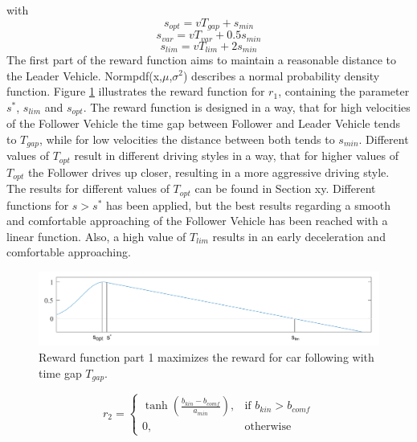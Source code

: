 \documentclass[review]{elsarticle}
\begin{document}
with
\begin{equation}
s_{opt} = vT_{gap} + s_{min}
\end{equation}
\begin{equation}
s_{var} = vT_{var} + 0.5s_{min}
\end{equation}
\begin{equation}
s_{lim} = vT_{lim} + 2s_{min}
\end{equation}
The first part of the reward function aims to maintain a reasonable distance to the Leader Vehicle.
Normpdf(x,$\mu$,$\sigma^2$) describes a normal probability density function. Figure \ref{fig:RewardFunc1} illustrates the reward function for $r_1$, containing the parameter $s^*$, $s_{lim}$ and $s_{opt}$. The reward function is designed in a way, that for high velocities of the Follower Vehicle the time gap between Follower and Leader Vehicle tends to $T_{gap}$, while for low velocities the distance between both tends to $s_{min}$. Different values of $T_{opt}$ result in different driving styles in a way, that for higher values of $T_{opt}$ the Follower drives up closer, resulting in a more aggressive driving style. The results for different values of $T_{opt}$ can be found in Section xy. Different functions for $ s > s^*$ has been applied, but the best results regarding a smooth and comfortable approaching of the Follower Vehicle has been reached with a linear function. Also, a high value of $T_{lim}$ results in an early deceleration and comfortable approaching. 

\begin{figure}
	\centering
	\includegraphics[width=12cm]{images/RewardFunc1}
	\caption{Reward function part 1 maximizes the reward for car following with time gap $T_{gap}$.}
	\label{fig:RewardFunc1}
\end{figure}


\begin{equation}
r_2 = 
\begin{cases}
\tanh\left(\frac{b_{kin}-b_{comf}}{a_{min}}\right),& \text{if } b_{kin}>b_{comf}\\
0,              & \text{otherwise}
\end{cases}
\end{equation}
\end{document}
